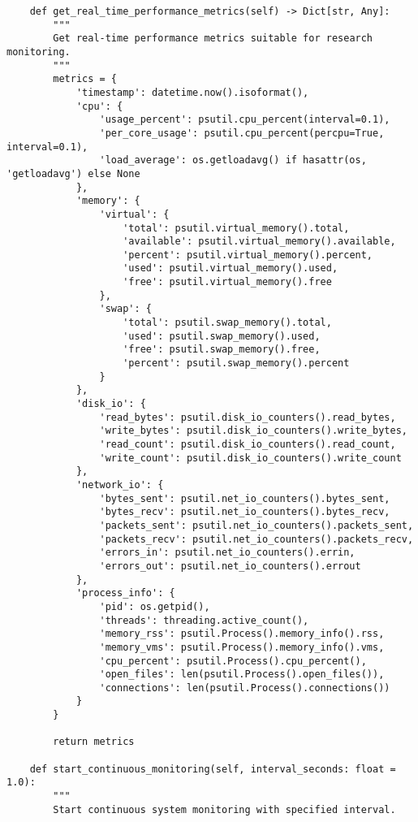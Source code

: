 \documentclass[11pt,a4paper]{article}
\begin{document}
\begin{verbatim}
    def get_real_time_performance_metrics(self) -> Dict[str, Any]:
        """
        Get real-time performance metrics suitable for research monitoring.
        """
        metrics = {
            'timestamp': datetime.now().isoformat(),
            'cpu': {
                'usage_percent': psutil.cpu_percent(interval=0.1),
                'per_core_usage': psutil.cpu_percent(percpu=True, interval=0.1),
                'load_average': os.getloadavg() if hasattr(os, 'getloadavg') else None
            },
            'memory': {
                'virtual': {
                    'total': psutil.virtual_memory().total,
                    'available': psutil.virtual_memory().available,
                    'percent': psutil.virtual_memory().percent,
                    'used': psutil.virtual_memory().used,
                    'free': psutil.virtual_memory().free
                },
                'swap': {
                    'total': psutil.swap_memory().total,
                    'used': psutil.swap_memory().used,
                    'free': psutil.swap_memory().free,
                    'percent': psutil.swap_memory().percent
                }
            },
            'disk_io': {
                'read_bytes': psutil.disk_io_counters().read_bytes,
                'write_bytes': psutil.disk_io_counters().write_bytes,
                'read_count': psutil.disk_io_counters().read_count,
                'write_count': psutil.disk_io_counters().write_count
            },
            'network_io': {
                'bytes_sent': psutil.net_io_counters().bytes_sent,
                'bytes_recv': psutil.net_io_counters().bytes_recv,
                'packets_sent': psutil.net_io_counters().packets_sent,
                'packets_recv': psutil.net_io_counters().packets_recv,
                'errors_in': psutil.net_io_counters().errin,
                'errors_out': psutil.net_io_counters().errout
            },
            'process_info': {
                'pid': os.getpid(),
                'threads': threading.active_count(),
                'memory_rss': psutil.Process().memory_info().rss,
                'memory_vms': psutil.Process().memory_info().vms,
                'cpu_percent': psutil.Process().cpu_percent(),
                'open_files': len(psutil.Process().open_files()),
                'connections': len(psutil.Process().connections())
            }
        }

        return metrics

    def start_continuous_monitoring(self, interval_seconds: float = 1.0):
        """
        Start continuous system monitoring with specified interval.


\end{verbatim}
\end{document}
